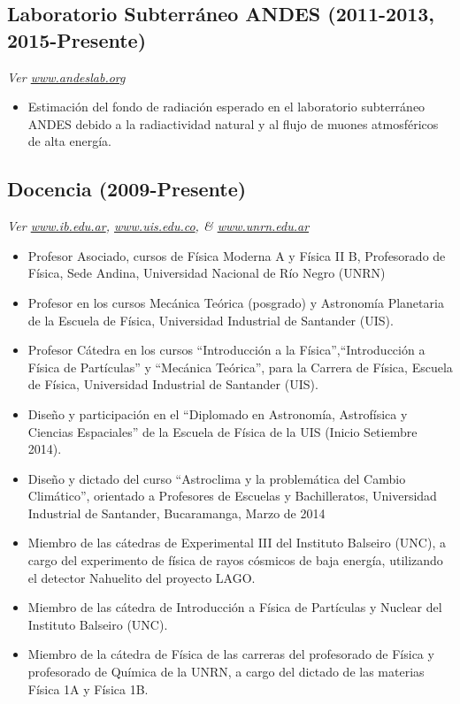 \subsection*{Laboratorio Subterráneo ANDES (2011-2013, 2015-Presente)}
{\small{\textit{Ver \href{http://www.andeslab.org}{www.andeslab.org}}}}
\begin{itemize}
\item Estimación del fondo de radiación esperado en el laboratorio subterráneo ANDES debido a la radiactividad natural y al flujo de muones atmosféricos de alta energía.
\end{itemize}

\subsection*{Docencia (2009-Presente)}
{\small{\textit{Ver \href{http://www.ib.edu.ar}{www.ib.edu.ar}, \href{http://www.uis.edu.co}{www.uis.edu.co}, \& \href{http://www.unrn.edu.ar}{www.unrn.edu.ar}}}}
\begin{itemize}
\item Profesor Asociado, cursos de Física Moderna A y Física II B, Profesorado de Física, Sede Andina, Universidad Nacional de Río Negro (UNRN)
\item Profesor en los cursos Mecánica Teórica (posgrado) y Astronomía Planetaria de la Escuela de Física, Universidad Industrial de Santander (UIS).
\item Profesor Cátedra en los cursos ``Introducción a la Física'',``Introducción a Física de Partículas'' y ``Mecánica Teórica'', para la Carrera de Física, Escuela de Física, Universidad Industrial de Santander (UIS).
\item Diseño y participación en el ``Diplomado en Astronomía, Astrofísica y Ciencias Espaciales'' de la Escuela de Física de la UIS (Inicio Setiembre 2014).
\item Diseño y dictado del curso ``Astroclima y la problemática del Cambio Climático'', orientado a Profesores de Escuelas y Bachilleratos, Universidad Industrial de Santander, Bucaramanga, Marzo de 2014
\item Miembro de las cátedras de Experimental III del Instituto Balseiro (UNC), a cargo del experimento de física de rayos cósmicos de baja energía, utilizando el detector Nahuelito del proyecto LAGO.
\item Miembro de las cátedra de Introducción a Física de Partículas y Nuclear del Instituto Balseiro (UNC).
\item Miembro de la cátedra de Física de las carreras del profesorado de Física y profesorado de Química de la UNRN, a cargo del dictado de las materias Física 1A y Física 1B.
\end{itemize}
\fi
